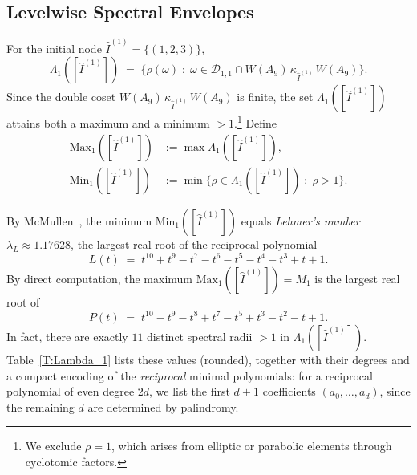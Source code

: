 \documentclass[11pt]{amsart}
\numberwithin{equation}{section}
\newcommand{\Max}{\mathrm{Max}}
\newcommand{\Min}{\mathrm{Min}}
\begin{document}
\subsection{Levelwise Spectral Envelopes}\label{SS:spectralE}

For the initial node $\widehat I^{(1)}=\{(1,2,3)\}$,
\[
\Lambda_1([\widehat I^{(1)}])
\;=\;
\bigl\{\rho(\omega)\;:\;
\omega\in\mathcal D_{1,1}\cap W(A_9)\,\kappa_{\widehat I^{(1)}}\,W(A_9)\bigr\}.
\]
Since the double coset $W(A_9)\,\kappa_{\widehat I^{(1)}}\,W(A_9)$ is finite, 
the set $\Lambda_1([\widehat I^{(1)}])$ attains both a maximum and a minimum $>1$.\footnote{%
We exclude $\rho=1$, which arises from elliptic or parabolic elements through cyclotomic factors.}
Define
\[
\begin{aligned}
\Max_1([\widehat I^{(1)}]) &:= \max \Lambda_1([\widehat I^{(1)}]),\\
\Min_1([\widehat I^{(1)}]) &:= \min\{\rho\in\Lambda_1([\widehat I^{(1)}]) \;:\; \rho>1\}.
\end{aligned}
\]

By McMullen~\cite[Thm.~4.1]{McMullen:2002}, 
the minimum $\Min_1([\widehat I^{(1)}])$ equals 
\emph{Lehmer's number} $\lambda_L\approx1.17628$, 
the largest real root of the reciprocal polynomial
\[
L(t)\;=\;t^{10}+t^9-t^7-t^6-t^5-t^4-t^3+t+1.
\]
By direct computation, the maximum $\Max_1([\widehat I^{(1)}])=M_1$ is the largest real root of
\[
P(t)\;=\;t^{10}-t^9-t^8+t^7-t^5+t^3-t^2-t+1.
\]
In fact, there are exactly $11$ distinct spectral radii $>1$ in $\Lambda_1([\widehat I^{(1)}])$.
Table~\ref{T:Lambda_1} lists these values (rounded), together with their degrees and a compact encoding of the
\emph{reciprocal} minimal polynomials: for a reciprocal polynomial of even degree $2d$,
we list the first $d{+}1$ coefficients $(a_0,\dots,a_d)$, since the remaining $d$ are determined by palindromy.
\end{document}
